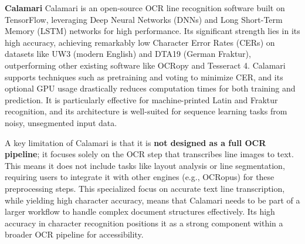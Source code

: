 \textbf{Calamari}
Calamari is an open-source OCR line recognition software built on TensorFlow, leveraging Deep Neural Networks (DNNs) and Long Short-Term Memory (LSTM) networks for high performance. Its significant strength lies in its high accuracy, achieving remarkably low Character Error Rates (CERs) on datasets like UW3 (modern English) and DTA19 (German Fraktur), outperforming other existing software like OCRopy and Tesseract 4. Calamari supports techniques such as pretraining and voting to minimize CER, and its optional GPU usage drastically reduces computation times for both training and prediction. It is particularly effective for machine-printed Latin and Fraktur recognition, and its architecture is well-suited for sequence learning tasks from noisy, unsegmented input data.

A key limitation of Calamari is that it is \textbf{not designed as a full OCR pipeline}; it focuses solely on the OCR step that transcribes line images to text. This means it does not include tasks like layout analysis or line segmentation, requiring users to integrate it with other engines (e.g., OCRopus) for these preprocessing steps. This specialized focus on accurate text line transcription, while yielding high character accuracy, means that Calamari needs to be part of a larger workflow to handle complex document structures effectively. Its high accuracy in character recognition positions it as a strong component within a broader OCR pipeline for accessibility.

